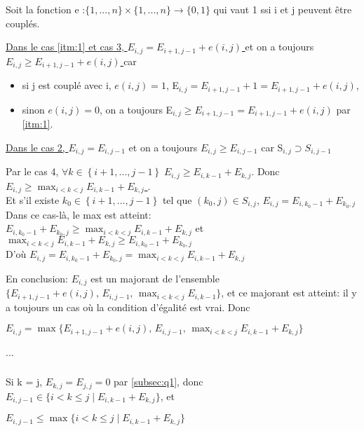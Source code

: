 \documentclass[french]{article}
\begin{document}
		Soit la fonction e :$ \{1, ... , n\} \times{} \{1, ... , n\} \rightarrow{} \{0, 1\}$ qui vaut 1 ssi i et j peuvent être couplés. \par
		\begin{description}
		\item
		\underline{Dans le cas  \ref{itm:1} et cas 3, $E_{i,j} = E_{i+1,j-1} + e(i,j)$ }  et on a toujours \underline{$E_{i,j} \geq E_{i+1,j-1} + e(i,j)$ }car 
			\begin{itemize} 
			\item si j est couplé avec i, $ e(i,j) = 1$, E$_{i,j}  = E_{i+1,j-1}+1 = E_{i+1,j-1}+ e(i,j) $, 
			\item sinon $ e(i,j) = 0$, on a toujours E$_{i,j} \geq E_{i+1,j-1} = E_{i+1,j-1}+ e(i,j)$ par \ref{itm:1}.
			\end{itemize}	
		\item
		\underline{Dans le cas 2, $E_{i,j} = E_{i,j-1}$} et on a toujours \underline{$E_{i,j} \geq E_{i,j-1}$} car S$_{i,j} \supset S_{i,j-1}$
		\item
		Par le cas 4, $\forall k \in\left\{ i+1,...,j-1\right\} \; E_{i,j} \geq E_{i,k-1} + E_{k,j}$. Donc \underline{ $E_{i,j} \geq  \displaystyle \max_{i<k<j}  E_{i,k-1} + E_{k,j}$ }.
		\\Et
		s'il existe $k_{0}\in\left\{ i+1,...,j-1\right\}$ tel que  $\left(k_{0},j\right)\in S_{i,j}$, $E_{i,j} = E_{i,k_{0}-1} + E_{k_{0},j}$\\
		Dans ce cas-là, le max est atteint:\\
		 $E_{i,k_{0}-1} + E_{k_{0},j} \geq  \displaystyle \max_{i<k<j}  E_{i,k-1} + E_{k,j}$ et $ \displaystyle \max_{i<k<j}  E_{i,k-1} + E_{k,j} \geq  E_{i,k_{0}-1} + E_{k_{0},j}$\\
		D'où \underline{ $E_{i,j} = E_{i,k_{0}-1} + E_{k_{0},j} = \displaystyle \max_{i<k<j}  E_{i,k-1} + E_{k,j}$}
		\end{description}
		En conclusion: $E_{i,j}$ est un majorant de l'ensemble $\{E_{i+1,j-1} + e(i,j), \, E_{i,j-1}, \,  \displaystyle \max_{i<k<j}  E_{i,k-1} \}$, et ce majorant est atteint: il y a toujours un cas où la condition d'égalité est vrai. 
		Donc
\begin{center}
 $E_{i,j} =\max\{E_{i+1,j-1} + e(i,j), \, E_{i,j-1}, \,  \displaystyle \max_{i<k<j}  E_{i,k-1} + E_{k,j}\}$
\par\end{center}
		...
	\subsubsection{}
	Si k = j, $ E_{k,j}=E_{j,j}=0$ par \ref{subsec:q1}, donc $E_{i,j-1}\in \{i<k\leq j \mid  E_{i,k-1} + E_{k,j}\} $, et 
\begin{center}
$E_{i,j-1}\leq \max\{i<k\leq j \mid  E_{i,k-1} + E_{k,j}\} $
\par\end{center}
\end{document}
